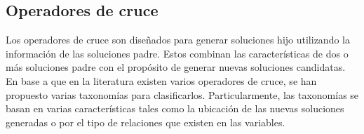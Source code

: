 \subsection{Operadores de cruce}

Los operadores de cruce son diseñados para generar soluciones hijo utilizando la información de las soluciones padre.
%
Estos combinan las características de dos o más soluciones padre con el propósito de generar nuevas soluciones candidatas.
%
En base a que en la literatura existen varios operadores de cruce, se han propuesto varias taxonomías para clasificarlos.
%
Particularmente, las taxonomías se basan en varias características tales como la ubicación de las nuevas soluciones generadas o por el tipo de relaciones que existen en las variables.

